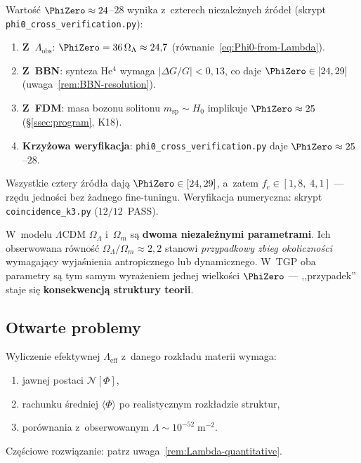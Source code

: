 \begin{remark}%
  \label{rem:phi0-four-constraints}
Warto\'s\'c $\PhiZero \approx 24$--$28$ wynika z~czterech
niezale\.znych \'zr\'ode\l{} (skrypt
\texttt{phi0\_cross\_verification.py}):
\begin{enumerate}[nosep]
  \item \textbf{Z~$\Lambda_{\mathrm{obs}}$}:
        $\PhiZero = 36\,\Omega_\Lambda \approx 24{,}7$
        (r\'ownanie~\ref{eq:Phi0-from-Lambda}).
  \item \textbf{Z~BBN}: synteza He$^4$ wymaga
        $|\Delta G/G| < 0{,}13$, co daje $\PhiZero \in [24, 29]$
        (uwaga~\ref{rem:BBN-resolution}).
  \item \textbf{Z~FDM}: masa bozonu solitonu
        $m_{\mathrm{sp}} \sim H_0$
        implikuje $\PhiZero \approx 25$
        (\S\ref{ssec:program}, K18).
  \item \textbf{Krzy\.zowa weryfikacja}:
        \texttt{phi0\_cross\_verification.py}
        daje $\PhiZero \approx 25$--$28$.
\end{enumerate}
Wszystkie cztery \'zr\'od\l{}a daj\k{a} $\PhiZero \in [24, 29]$,
a~zatem $f_c \in [1{,}8,\;4{,}1]$ --- rz\k{e}du jedno\'sci bez
\.zadnego fine-tuningu.
Weryfikacja numeryczna: skrypt \texttt{coincidence\_k3.py}
($12/12$~PASS).
\end{remark}

\begin{remark}\label{rem:k3-vs-lcdm}
W~modelu $\Lambda$CDM $\Omega_\Lambda$ i~$\Omega_m$ s\k{a}
\textbf{dwoma niezale\.znymi parametrami}.
Ich obserwowana r\'owno\'s\'c $\Omega_\Lambda/\Omega_m
\approx 2{,}2$ stanowi \emph{przypadkowy zbieg okoliczno\'sci}
wymagaj\k{a}cy wyja\'snienia antropicznego lub dynamicznego.
W~TGP oba parametry s\k{a} tym samym wyra\.zeniem jednej
wielko\'sci $\PhiZero$ --- ,,przypadek'' staje si\k{e}
\textbf{konsekwencj\k{a} struktury teorii}.
\end{remark}

\subsection{Otwarte problemy}\label{ssec:de-prob}

\begin{problem}\label{prob:Lambda}
Wyliczenie efektywnej $\Lambda_{\mathrm{eff}}$ z~danego
rozk\l{}adu materii wymaga:
\begin{enumerate}[nosep]
  \item jawnej postaci $\mathcal{N}[\Phi]$,
  \item rachunku \'sredniej $\langle\Phi\rangle$ po
        realistycznym rozk\l{}adzie struktur,
  \item por\'ownania z~obserwowanym $\Lambda \sim
        10^{-52}\;\mathrm{m}^{-2}$.
\end{enumerate}
Cz\k{e}\'sciowe rozwi\k{a}zanie: patrz uwaga~\ref{rem:Lambda-quantitative}.
\end{problem}


